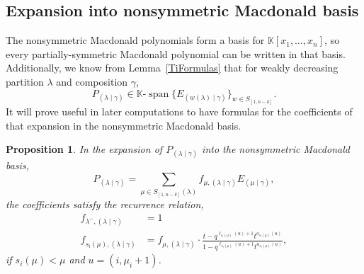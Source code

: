 \documentclass[11pt]{article}
\newtheorem{prop}[theo]{Proposition}
\theoremstyle{definition}
\numberwithin{equation}{section}
\newcommand{\Lq}{\mathbb{K}}
\newcommand{\Spann}{\text{-}\operatorname{span}}
\newcommand{\Sn}{S_{[1,n-k]}}
\newcommand{\PP}{P_{(\lambda \mid \gamma)}}
\newcommand{\Pn}{P_{(\lambda \mid \gamma)}}
\newcommand{\nudom}{{( \lambda \mid \gamma )}}
\newcommand{\lambdagamma}{{\nudom}}
\newcommand{\mugamma}{{(\mu \mid \gamma)}}
\newcommand{\fmu}{f_{\mu,\lambdagamma}}
\newcommand{\fsimu}{{f_{s_i(\mu),\lambdagamma}}}
\newcommand{\betaa}{{q^{\ell_{s_i(\mu)}(u)+1} t^{a_{s_i(\mu)}(u)}}}
\begin{document}
\subsection{Expansion into nonsymmetric Macdonald basis}
The nonsymmetric Macdonald polynomials form a basis for $\Lq[x_1, \dotsc, x_n]$, so every partially-symmetric Macdonald polynomial can be written in that basis. Additionally, we know from Lemma~\ref{TiFormulas} that for weakly decreasing partition $\lambda$ and composition $\gamma$,
\[ \Pn \in \Lq \Spann \{ E_{(w(\lambda) \mid \gamma)}\}_{w\in \Sn }.\]
It will prove useful in later computations to have formulas for the coefficients of that expansion in the nonsymmetric Macdonald basis.


\begin{prop}\label{Pexpansion}
In the expansion of $\PP$ into the nonsymmetric Macdonald basis,
\[ \PP = \sum_{\mu \in S_{[1,n-k]}(\lambda)} \fmu E_{\mugamma},\]
the coefficients satisfy the recurrence relation,
\begin{align} 
f_{\lambda^-,\lambdagamma} &= 1 \label{identity}\\
\fsimu &= \fmu \cdot \frac{t-\betaa}{1-\betaa},\label{recursion}\end{align}
if $s_i(\mu) < \mu$ and $u=(i, \mu_{i}+1)$.
\end{prop}
\end{document}
